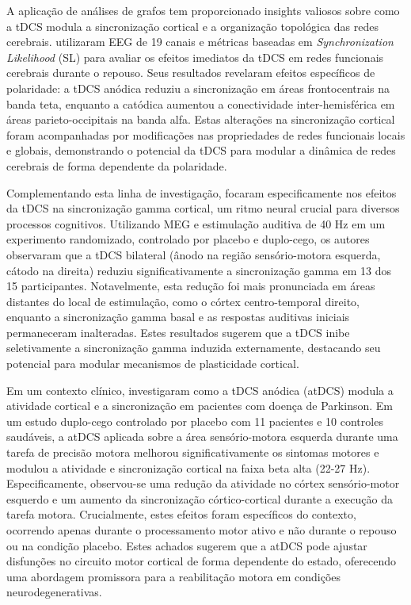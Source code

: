 A aplicação de análises de grafos tem proporcionado insights valiosos sobre como a tDCS modula a sincronização cortical e a organização topológica das redes cerebrais.  utilizaram EEG de 19 canais e métricas baseadas em \textit{Synchronization Likelihood} (SL) para avaliar os efeitos imediatos da tDCS em redes funcionais cerebrais durante o repouso. Seus resultados revelaram efeitos específicos de polaridade: a tDCS anódica reduziu a sincronização em áreas frontocentrais na banda teta, enquanto a catódica aumentou a conectividade inter-hemisférica em áreas parieto-occipitais na banda alfa. Estas alterações na sincronização cortical foram acompanhadas por modificações nas propriedades de redes funcionais locais e globais, demonstrando o potencial da tDCS para modular a dinâmica de redes cerebrais de forma dependente da polaridade.

Complementando esta linha de investigação,  focaram especificamente nos efeitos da tDCS na sincronização gamma cortical, um ritmo neural crucial para diversos processos cognitivos. Utilizando MEG e estimulação auditiva de 40 Hz em um experimento randomizado, controlado por placebo e duplo-cego, os autores observaram que a tDCS bilateral (ânodo na região sensório-motora esquerda, cátodo na direita) reduziu significativamente a sincronização gamma em 13 dos 15 participantes. Notavelmente, esta redução foi mais pronunciada em áreas distantes do local de estimulação, como o córtex centro-temporal direito, enquanto a sincronização gamma basal e as respostas auditivas iniciais permaneceram inalteradas. Estes resultados sugerem que a tDCS inibe seletivamente a sincronização gamma induzida externamente, destacando seu potencial para modular mecanismos de plasticidade cortical.

Em um contexto clínico,  investigaram como a tDCS anódica (atDCS) modula a atividade cortical e a sincronização em pacientes com doença de Parkinson. Em um estudo duplo-cego controlado por placebo com 11 pacientes e 10 controles saudáveis, a atDCS aplicada sobre a área sensório-motora esquerda durante uma tarefa de precisão motora melhorou significativamente os sintomas motores e modulou a atividade e sincronização cortical na faixa beta alta (22-27 Hz). Especificamente, observou-se uma redução da atividade no córtex sensório-motor esquerdo e um aumento da sincronização córtico-cortical durante a execução da tarefa motora. Crucialmente, estes efeitos foram específicos do contexto, ocorrendo apenas durante o processamento motor ativo e não durante o repouso ou na condição placebo. Estes achados sugerem que a atDCS pode ajustar disfunções no circuito motor cortical de forma dependente do estado, oferecendo uma abordagem promissora para a reabilitação motora em condições neurodegenerativas.

